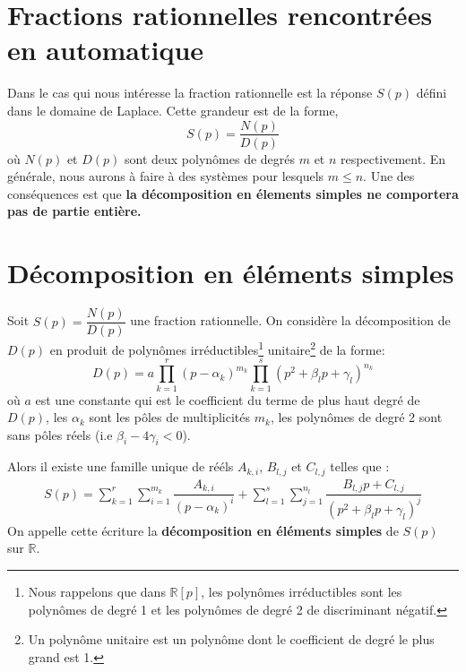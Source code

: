 \section{Fractions rationnelles rencontrées en automatique}
Dans le cas qui nous intéresse la fraction rationnelle est la 
réponse $S(p)$ défini dans le domaine de Laplace.
Cette grandeur est de la forme,
\[
S(p)=\dfrac{N(p)}{D(p)}
\]
où $N(p)$ et $D(p)$ sont deux polynômes de degrés $m$ et $n$ respectivement.
En générale, nous aurons à faire à des systèmes pour lesquels $m\le n$. 
Une des conséquences est que \textbf{la décomposition en élements 
simples ne comportera pas de partie entière.}

\section{Décomposition en éléments simples}
Soit $S(p)=\dfrac{N(p)}{D(p)}$ une fraction rationnelle. On considère la 
décomposition de $D(p)$ en produit de polynômes irréductibles\footnote{Nous 
rappelons que dans $\mathbb{R}[p]$, les polynômes irréductibles sont 
les polynômes de degré 1 et les polynômes de degré 2 de discriminant négatif.}
unitaire\footnote{Un polynôme unitaire est un polynôme dont le coefficient 
de degré le plus grand est 1.} de la forme:
\[
D(p)=a\prod_{k=1}^r(p-\alpha_k)^{m_k}\prod_{k=1}^s(p^2+\beta_lp+\gamma_l)^{n_k}
\]
où $a$ est une constante qui est le coefficient du terme de plus haut degré 
de $D(p)$, les $\alpha_k$ sont les pôles de multiplicités $m_k$, les polynômes
de degré 2 sont sans pôles réels (i.e $\beta_i-4\gamma_i<0$).

Alors il existe une famille unique de rééls $A_{k,i}$, $B_{l,j}$ et 
$C_{l,j}$ telles que :
\begin{align}
S(p)=\sum_{k=1}^r\sum_{i=1}^{m_k} \dfrac{A_{k,i}}{\left(p-\alpha_k\right)^i}+
     \sum_{l=1}^s\sum_{j=1}^{n_l} \dfrac{B_{l,j}p+C_{l,j}}{\left(p^2+\beta_lp+
     \gamma_l\right)^j}
\end{align}
On appelle cette écriture la \textbf{décomposition en éléments simples} de 
$S(p)$ sur $\mathbb{R}$.
